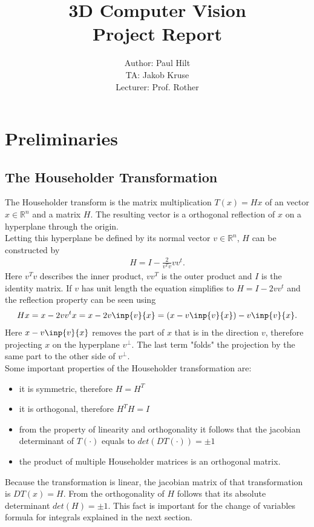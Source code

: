 \documentclass{article}
\begin{document}
\title{3D Computer Vision\\
	Project Report}
\author{Author: Paul Hilt \\
		TA: Jakob Kruse \\
		Lecturer: Prof. Rother}

\maketitle
\section{Preliminaries}
\subsection{The Householder Transformation}
The Householder transform is the matrix multiplication $T(x)=Hx$ of an vector $x \in \mathbb{R}^n$ and a matrix $H$. The resulting vector is a orthogonal reflection of $x$ on a hyperplane through the origin. \\
Letting this hyperplane be defined by its normal vector $v\in \mathbb{R}^n$, $H$ can be constructed by
\begin{align}
	H = I - \frac{2}{v^Tv}vv^t .
\end{align}
Here $v^Tv$ describes the inner product, $vv^T$ is the outer product and $I$ is the identity matrix. If $v$ has unit length the equation simplifies to $H = I - 2vv^t$ and the reflection property can be seen using
\begin{align}
Hx = x - 2vv^tx = x - 2v \inp{v}{x} = (x - v \inp{v}{x}) - v \inp{v}{x} .
\end{align}
Here $x - v \inp{v}{x}$ removes the part of $x$ that is in the direction $v$, therefore projecting $x$ on the hyperplane $v^{\perp}$. The last term "folds" the projection by the same part to the other side of $v^{\perp}$. \\
Some important properties of the Householder transformation are:\\
\begin{itemize}
	\item it is symmetric, therefore $H=H^T$
	\item it is orthogonal, therefore $H^TH=I$
	\item from the property of linearity and orthogonality it follows that the jacobian determinant of $T(\cdot)$ equals to $det(DT(\cdot)) = \pm 1$
	\item the product of multiple Householder matrices is an orthogonal matrix.
\end{itemize}
Because the transformation is linear, the jacobian matrix of that transformation is $DT(x) = H$. From the orthogonality of $H$ follows that its absolute determinant $det(H) = \pm 1$. This fact is important for the change of variables formula for integrals explained in the next section. 
\end{document}
